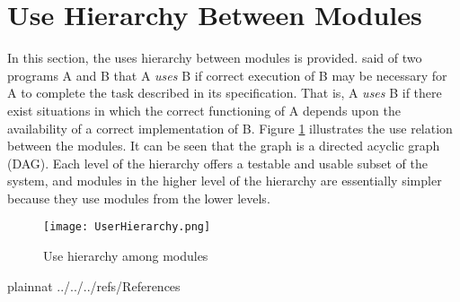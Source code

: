 \documentclass[12pt, titlepage]{article}
\begin{document}
\section{Use Hierarchy Between Modules} \label{SecUse}

In this section, the uses hierarchy between modules is
provided. \citet{Parnas1978} said of two programs A and B that A {\em uses} B if
correct execution of B may be necessary for A to complete the task described in
its specification. That is, A {\em uses} B if there exist situations in which
the correct functioning of A depends upon the availability of a correct
implementation of B.  Figure \ref{FigUH} illustrates the use relation between
the modules. It can be seen that the graph is a directed acyclic graph
(DAG). Each level of the hierarchy offers a testable and usable subset of the
system, and modules in the higher level of the hierarchy are essentially simpler
because they use modules from the lower levels.

\begin{figure}[H]
\centering
\texttt{[image: UserHierarchy.png]}

\caption{Use hierarchy among modules}

\label{FigUH}
\end{figure}


 {plainnat}
%
 {../../../refs/References}

\newpage{}
\end{document}
